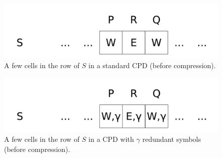 \begin{figure}[tb]
	\centering
	\includegraphics[width=.5\columnwidth]{rows.pdf}
	\caption{A few cells in the row of $S$ in a standard CPD (before compression).}
	\label{fig-row-1}
\end{figure}


\begin{figure}[tb]
	\centering
	\includegraphics[width=.5\columnwidth]{rows2.pdf}
	\caption{A few cells in the row of $S$ in a CPD with $\gamma$ redundant symbols (before compression).}
	\label{fig-row-2}
\end{figure}


